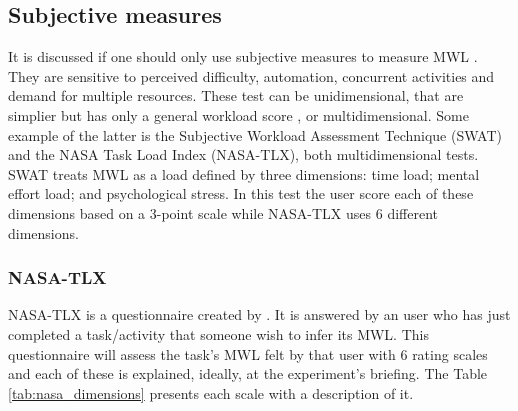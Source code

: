     \subsection{Subjective measures}
    \label{subsec:subjective_measures}    

        It is discussed if one should only use subjective measures to measure MWL \cite{sanders1998human, stanton2004handbook}. They are sensitive to perceived difficulty, automation, concurrent activities and demand for multiple resources. These test can be unidimensional, that are simplier but has only a general workload score \cite{stanton2004handbook}, or multidimensional. Some example of the latter is the Subjective Workload Assessment Technique (SWAT) and the NASA Task Load Index (NASA-TLX), both multidimensional tests. SWAT treats MWL as a load defined by three dimensions: time load; mental effort load; and psychological stress. In this test the user score each of these dimensions based on a 3-point scale while NASA-TLX uses 6 different dimensions.
        
        \subsubsection{NASA-TLX}
        \label{subsec:nasa_tlx}
        
            NASA-TLX is a questionnaire created by . It is answered by an user who has just completed a task/activity that someone wish to infer its MWL. This questionnaire will assess the task's MWL felt by that user with 6 rating scales and each of these is explained, ideally, at the experiment's briefing. The Table \ref{tab:nasa_dimensions} presents each scale with a description of it.
        
